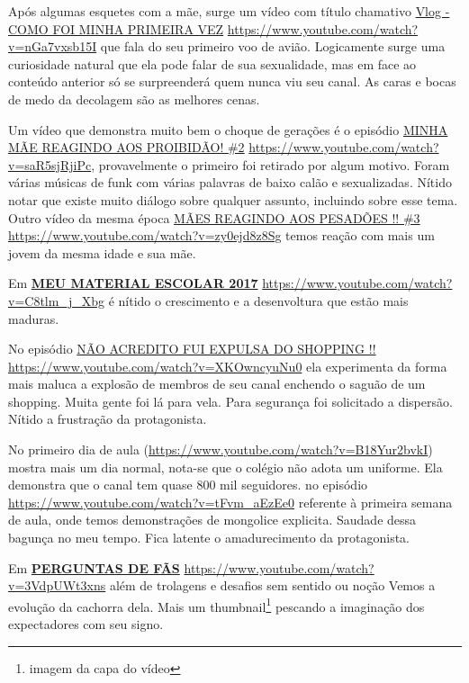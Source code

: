 Após algumas esquetes com a mãe, surge um vídeo com título chamativo \href{https://www.youtube.com/watch?v=nGa7vxsb15I}{Vlog - COMO FOI MINHA PRIMEIRA VEZ} \url{https://www.youtube.com/watch?v=nGa7vxsb15I} que fala do seu primeiro voo de avião. Logicamente surge uma curiosidade natural que ela pode falar de sua sexualidade, mas em face ao conteúdo anterior só se surpreenderá quem nunca viu seu canal. As caras e bocas de medo da decolagem são as melhores cenas.

Um vídeo que demonstra muito bem o choque de gerações é o episódio \href{https://www.youtube.com/watch?v=saR5sjRjiPc}{MINHA MÃE REAGINDO AOS PROIBIDÃO! \#2}
 \url{https://www.youtube.com/watch?v=saR5sjRjiPc}, provavelmente o primeiro foi retirado por algum motivo. Foram várias músicas de funk com várias palavras de baixo calão e sexualizadas. Nítido notar que existe muito diálogo sobre qualquer assunto, incluindo sobre esse tema. Outro vídeo da mesma época \href{https://www.youtube.com/watch?v=zy0ejd8z8Sg}{MÃES REAGINDO AOS PESADÕES !! \#3} \url{https://www.youtube.com/watch?v=zy0ejd8z8Sg} temos reação com mais um jovem da mesma idade e sua mãe.

Em \href{https://www.youtube.com/watch?v=C8tlm_j_Xbg}{\textbf{MEU MATERIAL ESCOLAR 2017}} \url{https://www.youtube.com/watch?v=C8tlm_j_Xbg} é nítido o crescimento e a desenvoltura que estão mais maduras.

No episódio \href{https://www.youtube.com/watch?v=XKOwncyuNu0}{NÃO ACREDITO FUI EXPULSA DO SHOPPING !!} \url{https://www.youtube.com/watch?v=XKOwncyuNu0} ela experimenta da forma mais maluca a explosão de membros de seu canal enchendo o saguão de um shopping. Muita gente foi lá para vela. Para segurança foi solicitado a dispersão. Nítido a frustração da protagonista.

No primeiro dia de aula (\url{https://www.youtube.com/watch?v=B18Yur2bvkI}) mostra mais um dia normal, nota-se que o colégio não adota um uniforme. Ela demonstra que o canal tem quase 800 mil seguidores. no episódio \url{https://www.youtube.com/watch?v=tFvm_aEzEe0} referente à primeira semana de aula, onde temos demonstrações de mongolice explicita. Saudade dessa bagunça no meu tempo. Fica latente o amadurecimento da protagonista.

Em \href{https://www.youtube.com/watch?v=3VdpUWt3xns}{\textbf{PERGUNTAS DE FÃS}} \url{https://www.youtube.com/watch?v=3VdpUWt3xns} além de trolagens e desafios sem sentido ou noção Vemos a evolução da cachorra dela. Mais um thumbnail\footnote{imagem da capa do vídeo} pescando a imaginação dos expectadores com seu signo.

